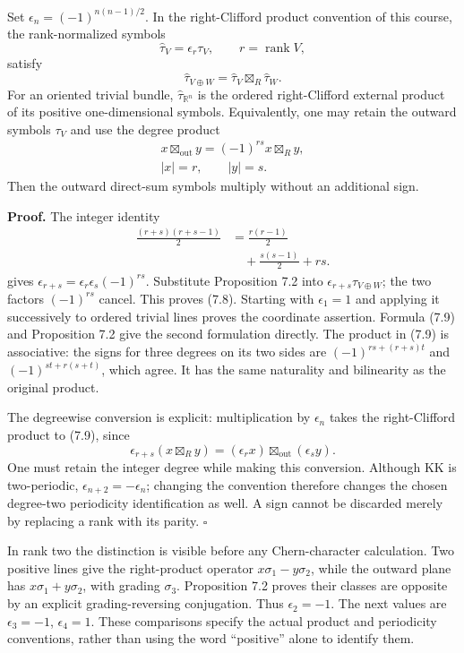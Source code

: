 \documentclass[
  11pt,
]{article}
\begin{document}
Set \(\epsilon_n=(-1)^{n(n-1)/2}\). In the right-Clifford product
convention of this course, the rank-normalized symbols \[
\widehat\tau_V=\epsilon_r\tau_V,
\qquad r=\operatorname{rank}V,
\] satisfy \[
\widehat\tau_{V\oplus W}
=\widehat\tau_V\boxtimes_R\widehat\tau_W.
\tag{7.8}
\] For an oriented trivial bundle, \(\widehat\tau_{\mathbb R^n}\) is the
ordered right-Clifford external product of its positive one-dimensional
symbols. Equivalently, one may retain the outward symbols \(\tau_V\) and
use the degree product \[
\begin{gathered}
x\boxtimes_{\mathrm{out}}y
=(-1)^{rs}x\boxtimes_R y,\\
|x|=r,\qquad |y|=s.
\end{gathered}
\tag{7.9}
\] Then the outward direct-sum symbols multiply without an additional
sign.

\textbf{Proof.} The integer identity \[
\begin{aligned}
\frac{(r+s)(r+s-1)}2
&=\frac{r(r-1)}2\\
&\quad+\frac{s(s-1)}2+rs.
\end{aligned}
\] gives \(\epsilon_{r+s}=\epsilon_r\epsilon_s(-1)^{rs}\). Substitute
Proposition 7.2 into \(\epsilon_{r+s}\tau_{V\oplus W}\); the two factors
\((-1)^{rs}\) cancel. This proves (7.8). Starting with \(\epsilon_1=1\)
and applying it successively to ordered trivial lines proves the
coordinate assertion. Formula (7.9) and Proposition 7.2 give the second
formulation directly. The product in (7.9) is associative: the signs for
three degrees on its two sides are \((-1)^{rs+(r+s)t}\) and
\((-1)^{st+r(s+t)}\), which agree. It has the same naturality and
bilinearity as the original product.

The degreewise conversion is explicit: multiplication by \(\epsilon_n\)
takes the right-Clifford product to (7.9), since \[
\epsilon_{r+s}(x\boxtimes_R y)
=(\epsilon_r x)\boxtimes_{\mathrm{out}}(\epsilon_s y).
\] One must retain the integer degree while making this conversion.
Although KK is two-periodic, \(\epsilon_{n+2}=-\epsilon_n\); changing
the convention therefore changes the chosen degree-two periodicity
identification as well. A sign cannot be discarded merely by replacing a
rank with its parity. \(\square\)

In rank two the distinction is visible before any Chern-character
calculation. Two positive lines give the right-product operator
\(x\sigma_1-y\sigma_2\), while the outward plane has
\(x\sigma_1+y\sigma_2\), with grading \(\sigma_3\). Proposition 7.2
proves their classes are opposite by an explicit grading-reversing
conjugation. Thus \(\epsilon_2=-1\). The next values are
\(\epsilon_3=-1\), \(\epsilon_4=1\). These comparisons specify the
actual product and periodicity conventions, rather than using the word
``positive'' alone to identify them.
\end{document}
